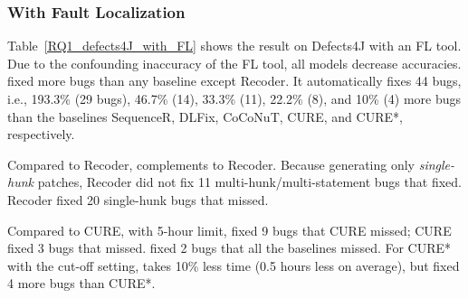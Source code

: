 \subsubsection{{\bf With Fault Localization}}

Table~\ref{RQ1_defects4J_with_FL} shows the result on
Defects4J with an FL tool. Due to the confounding inaccuracy of the FL
tool, all models decrease accuracies. {\tool} fixed more bugs
than any baseline except Recoder. It automatically fixes 44 bugs,
i.e., 193.3\% (29 bugs), 46.7\% (14), 33.3\% (11), 22.2\% (8), and
10\% (4) more bugs than the baselines SequenceR, DLFix, CoCoNuT, CURE,
and CURE*, respectively.

Compared to Recoder, {\tool} complements to Recoder.  Because
generating only {\em single-hunk} patches, Recoder did not fix 11
multi-hunk/multi-statement bugs that {\tool} fixed. Recoder fixed 20
single-hunk bugs that {\tool} missed.

Compared to CURE, with 5-hour limit, {\tool} fixed 9 bugs that CURE
missed; CURE fixed 3 bugs that {\tool} missed. {\tool} fixed
2 bugs that all the baselines missed. For CURE* with the
cut-off setting, {\tool} takes 10\% less time (0.5 hours less on
average), but fixed 4 more bugs than CURE*.




%





